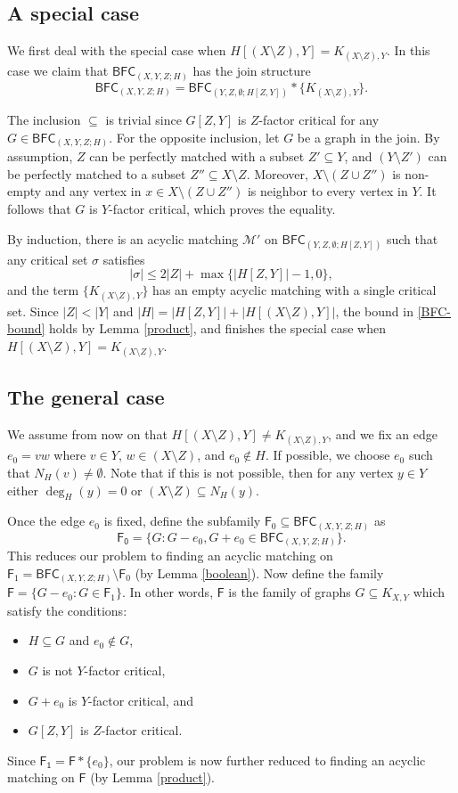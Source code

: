 \documentclass[10pt]{amsart}
\theoremstyle{definition}
\begin{document}
	
	\subsection*{A special case} We first deal with the special case when $H[(X\setminus Z), Y]  = K_{(X\setminus Z), Y}$. In this case we claim that  $\mathsf{BFC}_{(X,Y,Z;H)}$ has the join structure
	\[\mathsf{BFC}_{(X,Y,Z;H)} = \mathsf{BFC}_{(Y,Z,\emptyset; H[Z,Y])} * \{K_{(X\setminus Z), Y}\}.\]
	
	The inclusion $\subseteq$ is trivial since $G[Z,Y]$ is $Z$-factor critical for any $G \in \mathsf{BFC}_{(X,Y,Z; H)}$. 
	For the opposite inclusion, let $G$ be a graph in the join. By assumption, $Z$ can be perfectly matched with a subset $Z'\subseteq Y$, and $(Y\setminus Z')$ can be perfectly matched to a subset $Z''\subseteq X\setminus Z$. Moreover, $X\setminus (Z\cup Z'')$ is non-empty and any vertex in $x \in X\setminus (Z\cup Z'')$ is neighbor to every vertex in $Y$. It follows that $G$ is $Y$-factor critical, which proves the equality.
	
	By induction, there is an acyclic matching $\mathcal{M}'$ on $\mathsf{BFC}_{(Y,Z,\emptyset; H[Z,Y])}$ such that any critical set $\sigma$ satisfies
	\[|\sigma| \leq 2|Z| + \max\{|H[Z,Y]|-1, 0\}, \]
	and the term $\{K_{(X\setminus Z), Y}\}$ has an empty acyclic matching with a single critical set. Since $|Z|<|Y|$ and $|H| = |H[Z,Y]| + |H[(X\setminus Z), Y]|$, the bound in \eqref{BFC-bound} holds by Lemma \ref{product}, and finishes the special case when $H[(X\setminus Z), Y]  = K_{(X\setminus Z), Y}$.
	
	\subsection*{The general case} We assume from now on that $H[(X\setminus Z), Y] \neq K_{(X\setminus Z), Y}$, and we fix an edge $e_0 = vw$ where $v\in Y$, $w\in (X\setminus Z)$, and $e_0\notin H$. If possible, we choose $e_0$ such that $N_H(v)\neq \emptyset$. Note that if this is not possible, then for any vertex $y\in Y$ either $\deg_H(y)= 0$ or $(X\setminus Z) \subseteq N_H(y)$.
	
	Once the edge $e_0$ is fixed, define the subfamily $\mathsf{F}_0\subseteq \mathsf{BFC}_{(X,Y,Z; H)}$ as
	\[\mathsf{F_0} = \{G : G-e_0, G+e_0 \in \mathsf{BFC}_{(X,Y,Z;H)}  \}.\]
	This reduces our problem  to finding an acyclic matching on $\mathsf{F}_1 = \mathsf{BFC}_{(X,Y,Z;H)} \setminus \mathsf{F}_0$ (by Lemma \ref{boolean}). Now define the family $\mathsf{F} = \{G-e_0 : G\in \mathsf{F}_1\}$. In other words,  $\mathsf{F}$ is the family of graphs $G\subseteq K_{X,Y}$ which satisfy the conditions:
	\begin{itemize}
		\item $H\subseteq G$ and $e_0\notin G$,
		\item $G$ is not $Y$-factor critical, 
		\item $G+e_0$ is $Y$-factor critical, and
		\item $G[Z,Y]$ is $Z$-factor critical.
	\end{itemize}
	Since $\mathsf{F_1} = \mathsf{F} * \{e_0\}$, our problem is now further reduced to finding an acyclic matching on $\mathsf{F}$ (by Lemma \ref{product}).
	
\end{document}
